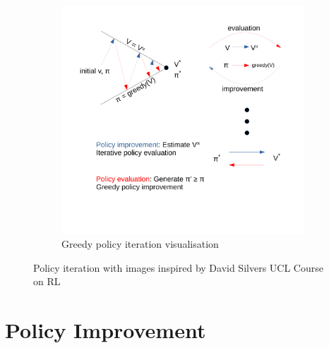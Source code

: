 \begin{figure}[!htb]
\begin{subfigure}{.49\textwidth}
		\includegraphics[width=1\linewidth]{MDP/fig/Policy_iteration.pdf}
		\caption{Greedy policy iteration visualisation\cite{David_Silver}}
		\label{fig:greedy_policy_iteration}
	\end{subfigure}
	\caption{Policy iteration with images inspired by David Silvers UCL Course on RL \cite{David_Silver}}
	\label{fig:policy_iteration}
\end{figure}

\section{Policy Improvement}

